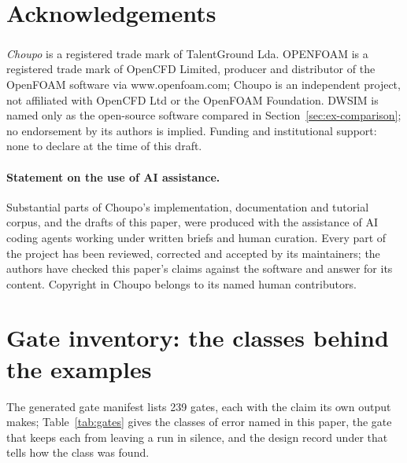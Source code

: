 \documentclass[11pt,a4paper]{article}
\newcommand{\code}[1]{\texttt{\detokenize{#1}}}
\begin{document}
\section*{Acknowledgements}

\emph{Choupo} is a registered trade mark of TalentGround Lda.
OPENFOAM\textsuperscript{\textregistered} is a registered trade mark of
OpenCFD Limited, producer and distributor of the OpenFOAM software via
www.openfoam.com; Choupo is an independent project, not affiliated with
OpenCFD Ltd or the OpenFOAM Foundation.  DWSIM is named only as the
open-source software compared in Section~\ref{sec:ex-comparison}; no
endorsement by its authors is implied.  Funding and institutional support:
none to declare at the time of this draft.

\paragraph{Statement on the use of AI assistance.}  Substantial parts of
Choupo's implementation, documentation and tutorial corpus, and the drafts
of this paper, were produced with the assistance of AI coding agents working
under written briefs and human curation.  Every part of the project has been
reviewed, corrected and accepted by its maintainers; the authors have
checked this paper's claims against the software and answer for its
content.  Copyright in Choupo belongs to its named human contributors.

\renewcommand{\bibfont}{\footnotesize}
\setlength{\bibsep}{2pt}



\appendix
\section{Gate inventory: the classes behind the examples}
\label{app:gates}

The generated gate manifest lists 239 gates, each with the claim its own
output makes; Table~\ref{tab:gates} gives the classes of error named in
this paper, the gate that keeps each from leaving a run in silence, and the
design record under \code{docs/design/} that tells how the class was found.
\end{document}
